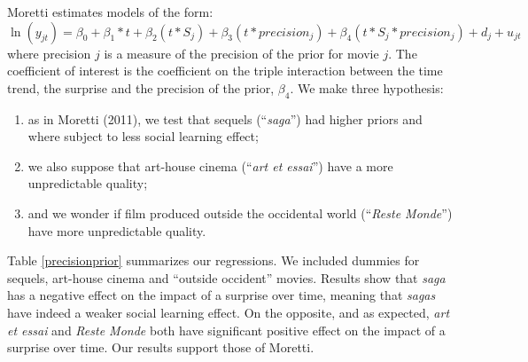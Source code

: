 \noindent Moretti estimates models of the form: \begin{equation}\label{key}
\ln(y_{jt})=\beta_0+\beta_1*t+\beta_2(t*S_j)+\beta_3(t*precision_j)+\beta_4(t*S_j*precision_j) +d_j+u_{jt}
\end{equation}
where precision $j$ is a measure of the precision of the prior for movie $j$. The coefficient of interest is the coefficient on the triple interaction between the time trend, the surprise and the precision of the prior, $\beta_4$. We make three hypothesis: \begin{enumerate}
	\item as in Moretti (2011), we test that sequels (``\textit{saga}'') had higher priors and where subject to less social learning effect;
	\item we also suppose that art-house cinema (``\textit{art et essai}'') have a more unpredictable quality;
	\item and we wonder if film produced outside the occidental world (``\textit{Reste Monde}'') have more unpredictable quality.
\end{enumerate}
Table \ref{precisionprior} summarizes our regressions. We included dummies for sequels, art-house cinema and ``outside occident'' movies. Results show that \textit{saga} has a negative effect on the impact of a surprise over time, meaning that \textit{sagas} have indeed a weaker social learning effect. On the opposite, and as expected, \textit{art et essai} and \textit{Reste Monde} both have significant positive effect on the impact of a surprise over time. Our results support those of Moretti.
